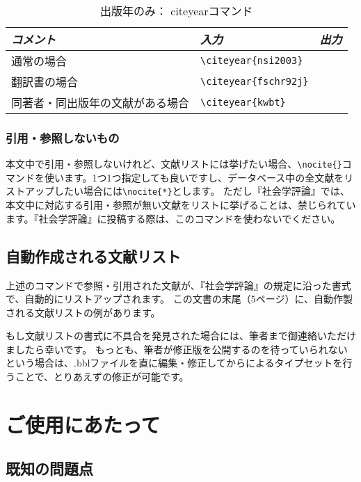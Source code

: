 \documentclass[article, 11pt]{jlreq}
\begin{document}
\begin{table}[htb]
\caption{ 出版年のみ： citeyearコマンド}
\label{citeyear}
\begin{center}
\begin{tabular}{lll} \hline
\emph{コメント} & \emph{入力} & \emph{出力} \\ \hline
通常の場合 & \verb|\citeyear{nsi2003}| & \citeyear{nsi2003} \\
翻訳書の場合 & \verb|\citeyear{fschr92j}| & \citeyear{fschr92j} \\
同著者・同出版年の文献がある場合 & \verb|\citeyear{kwbt}| & \citeyear{kwbt} \\
\hline
\end{tabular}
\end{center}
\end{table}


\subsubsection{引用・参照しないもの}

本文中で引用・参照しないけれど、文献リストには挙げたい場合、\verb|\nocite{}|コマンドを使います。1つ1つ指定しても良いですし、データベース中の全文献をリストアップしたい場合には\verb|\nocite{*}|とします。
ただし『社会学評論』では、本文中に対応する引用・参照が無い文献をリストに挙げることは、禁じられています。『社会学評論』に投稿する際は、このコマンドを使わないでください。


\subsection{自動作成される文献リスト}

上述のコマンドで参照・引用された文献が、『社会学評論』の規定に沿った書式で、自動的にリストアップされます。
この文書の末尾（5ページ）に、自動作製される文献リストの例があります。

もし文献リストの書式に不具合を発見された場合には、筆者まで御連絡いただけましたら幸いです。
もっとも、筆者が修正版を公開するのを待っていられないという場合は、.bblファイルを直に編集・修正してから\LaTeXe によるタイプセットを行うことで、とりあえずの修正が可能です。

\section{ご使用にあたって}
\subsection{既知の問題点}
\end{document}
